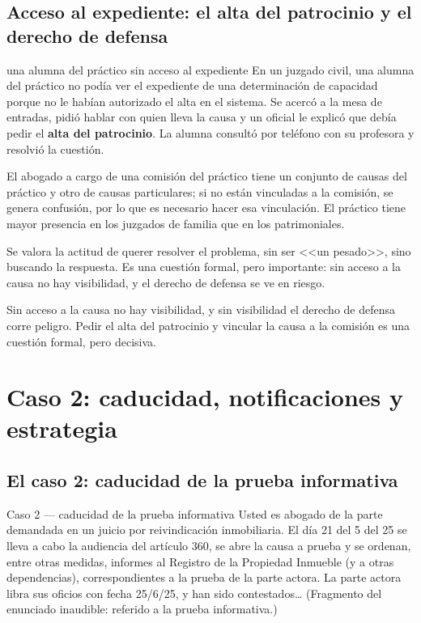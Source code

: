 \documentclass[12pt,oneside]{book}
\begin{document}
\section{Acceso al expediente: el alta del patrocinio y el derecho de defensa}

\begin{example}{una alumna del práctico sin acceso al expediente}
En un juzgado civil, una alumna del práctico no podía ver el expediente de una determinación de capacidad porque no le habían autorizado el alta en el sistema. Se acercó a la mesa de entradas, pidió hablar con quien lleva la causa y un oficial le explicó que debía pedir el \textbf{alta del patrocinio}. La alumna consultó por teléfono con su profesora y resolvió la cuestión.
\end{example}

El abogado a cargo de una comisión del práctico tiene un conjunto de causas del práctico y otro de causas particulares; si no están vinculadas a la comisión, se genera confusión, por lo que es necesario hacer esa vinculación. El práctico tiene mayor presencia en los juzgados de familia que en los patrimoniales.

Se valora la actitud de querer resolver el problema, sin ser <<un pesado>>, sino buscando la respuesta. Es una cuestión formal, pero importante: sin acceso a la causa no hay visibilidad, y el derecho de defensa se ve en riesgo.

\begin{important}
Sin acceso a la causa no hay visibilidad, y sin visibilidad el derecho de defensa corre peligro. Pedir el alta del patrocinio y vincular la causa a la comisión es una cuestión formal, pero decisiva.
\end{important}

\chapter{Caso 2: caducidad, notificaciones y estrategia}

\section{El caso 2: caducidad de la prueba informativa}

\begin{exercise}{Caso 2 --- caducidad de la prueba informativa}
Usted es abogado de la parte demandada en un juicio por reivindicación inmobiliaria. El día 21 del 5 del 25 se lleva a cabo la audiencia del artículo 360, se abre la causa a prueba y se ordenan, entre otras medidas, informes al Registro de la Propiedad Inmueble (y a otras dependencias), correspondientes a la prueba de la parte actora. La parte actora libra sus oficios con fecha 25/6/25, y han sido contestados\ldots{} (Fragmento del enunciado inaudible: referido a la prueba informativa.)
\end{exercise}
\end{document}
